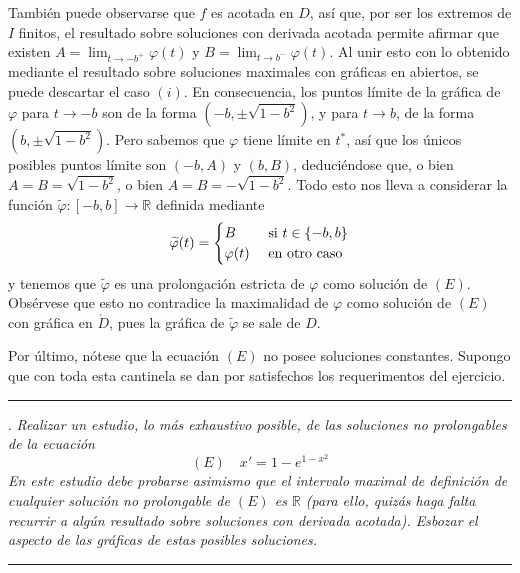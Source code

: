\documentclass[11pt]{report}
\newcommand{\R}{\mathbb R}
\begin{document}
También puede observarse que $f$ es acotada en $D$, así que, por ser los extremos de $I$ finitos, el resultado sobre soluciones con derivada acotada permite afirmar que existen $A=\lim_{t\to -b^+}\varphi(t)$ y $B = \lim_{t \to b^-}\varphi(t)$. Al unir esto con lo obtenido mediante el resultado sobre soluciones maximales con gráficas en abiertos, se puede descartar el caso $(i)$. En consecuencia, los puntos límite de la gráfica de $\varphi$ para $t \to -b$ son de la forma $(-b,\pm\sqrt{1-b^2})$, y para $t \to b$, de la forma $(b,\pm\sqrt{1-b^2})$. Pero sabemos que $\varphi$ tiene límite en $t^*$, así que los únicos posibles puntos límite son $(-b,A)$ y $(b,B)$, deduciéndose que, o bien $A=B=\sqrt{1-b^2}$, o bien $A=B=-\sqrt{1-b^2}$. Todo esto nos lleva a considerar la función $\widetilde{\varphi} \colon [-b,b] \to \R$ definida mediante
\[\widetilde{\varphi}(t)=\begin{cases}
    B &  $ si $ t \in \{-b,b\} \\
    \varphi(t) & $ en otro caso$
\end{cases}\]
y tenemos que $\widetilde{\varphi}$ es una prolongación estricta de $\varphi$ como solución de $(E)$. Obsérvese que esto no contradice la maximalidad de $\varphi$ como solución de $(E)$ con gráfica en $\mathring{D}$, pues la gráfica de $\widetilde{\varphi}$ se sale de $D$.

\vspace{2mm}

Por último, nótese que la ecuación $(E)$ no posee soluciones constantes. Supongo que con toda esta cantinela se dan por satisfechos los requerimentos del ejercicio.

\vspace{4mm}

\hrule

\vspace{4mm}

. \textit{Realizar un estudio, lo más exhaustivo posible, de las soluciones no prolongables de la ecuación}
\[(E) \quad x'=1-e^{1-x^2}\]
\textit{En este estudio debe probarse asimismo que el intervalo maximal de definición de cualquier solución no prolongable de $(E)$ es $\R$ (para ello, quizás haga falta recurrir a algún resultado sobre soluciones con derivada acotada). Esbozar el aspecto de las gráficas de estas posibles soluciones.}

\vspace{4mm}

\hrule

\vspace{4mm}
\end{document}
